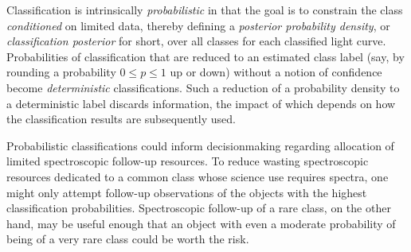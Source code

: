 Classification is intrinsically \textit{probabilistic} in that the goal is to constrain the class \textit{conditioned} on limited data, thereby defining a \textit{posterior probability density}, or \textit{classification posterior} for short, over all classes for each classified light curve.
Probabilities of classification that are reduced to an estimated class label (say, by rounding a probability $0 \leq p \leq 1$ up or down) without a notion of confidence become \textit{deterministic} classifications.
Such a reduction of a probability density to a deterministic label discards information, the impact of which depends on how the classification results are subsequently used.

Probabilistic classifications could inform decisionmaking regarding allocation of limited spectroscopic follow-up resources.
To reduce wasting spectroscopic resources dedicated to a common class whose science use requires spectra, one might only attempt follow-up observations of the objects with the highest classification probabilities.
Spectroscopic follow-up of a rare class, on the other hand, may be useful enough that an object with even a moderate probability of being of a very rare class could be worth the risk.

